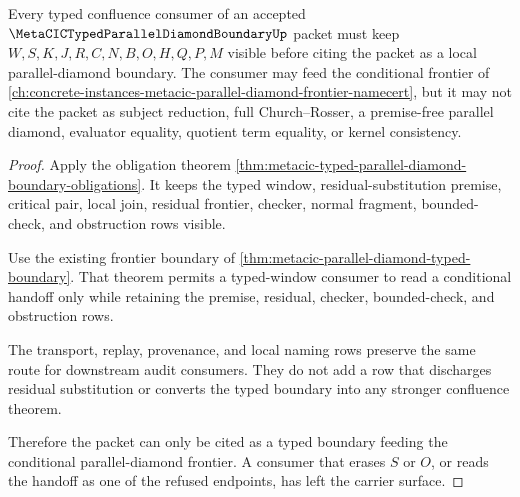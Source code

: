 \begin{theorem}
\label{thm:metacic-typed-parallel-diamond-boundary-nonescape}
Every typed confluence consumer of an accepted $\MetaCICTypedParallelDiamondBoundaryUp$ packet must keep $W,S,K,J,R,C,N,B,O,H,Q,P,M$ visible before citing the packet as a local parallel-diamond boundary. The consumer may feed the conditional frontier of \autoref{ch:concrete-instances-metacic-parallel-diamond-frontier-namecert}, but it may not cite the packet as subject reduction, full Church--Rosser, a premise-free parallel diamond, evaluator equality, quotient term equality, or kernel consistency.
\end{theorem}
\begin{proof}
Apply the obligation theorem \autoref{thm:metacic-typed-parallel-diamond-boundary-obligations}. It keeps the typed window, residual-substitution premise, critical pair, local join, residual frontier, checker, normal fragment, bounded-check, and obstruction rows visible.

Use the existing frontier boundary of \autoref{thm:metacic-parallel-diamond-typed-boundary}. That theorem permits a typed-window consumer to read a conditional handoff only while retaining the premise, residual, checker, bounded-check, and obstruction rows.

The transport, replay, provenance, and local naming rows preserve the same route for downstream audit consumers. They do not add a row that discharges residual substitution or converts the typed boundary into any stronger confluence theorem.

Therefore the packet can only be cited as a typed boundary feeding the conditional parallel-diamond frontier. A consumer that erases $S$ or $O$, or reads the handoff as one of the refused endpoints, has left the carrier surface.
\end{proof}



